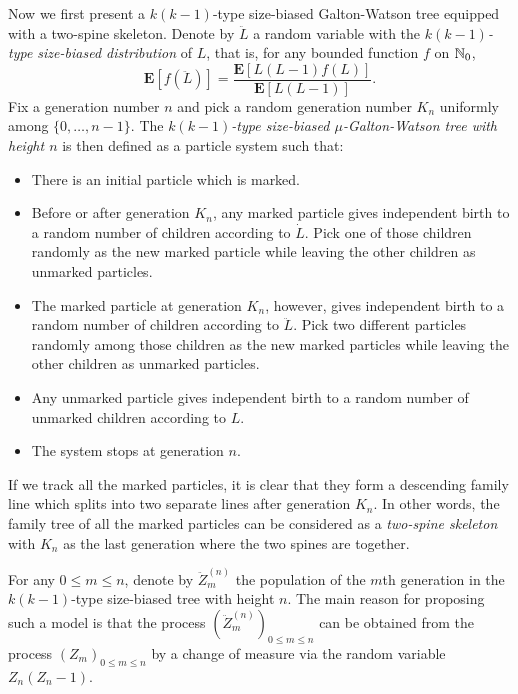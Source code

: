 \documentclass[12pt]{amsart}
\numberwithin{equation}{section}
\newcommand{\defn}[1]{{\em #1}}
\newcommand{\expr}[1]{\left( #1 \right)}
\newcommand{\brac}[1]{\left[ #1 \right]}
\newcommand{\expct}{\mathbf E}
\begin{document}
Now we first present a $k(k-1)$-type size-biased Galton-Watson tree equipped with a two-spine skeleton.
	Denote by $\ddot L$ a random variable with the \defn{$k(k-1)$-type size-biased distribution} of $L$, that is, for any
		bounded function $f$ on $\mathbb N_0$,
\begin{equation*}
		\expct\brac{f\expr{\ddot L}}
	=
		\frac{\expct\brac{L(L-1)f(L)}}{\expct\brac{L(L-1)}}.
\end{equation*}
	Fix a generation number $n$ and pick a random generation number $K_n$ uniformly among
		$\{0,\dots,n-1\}$.
	The \defn{$k(k-1)$-type size-biased $\mu$-Galton-Watson tree with height $n$} is then defined as a particle system such that:
\begin{itemize}
\item
	There is an initial particle which is marked.
\item
	Before or after generation $K_n$, any marked particle gives independent birth to a random number of children according to $\dot L$.
	Pick one of those children randomly as the new marked particle while leaving the other children as unmarked particles.
\item
	The marked particle at generation $K_n$, however, gives independent birth to a random number of children according to $\ddot L$.
	Pick two different particles randomly among those children as the new marked particles while leaving the other children as unmarked particles.
\item
	Any unmarked particle gives independent birth to a random number of unmarked children according to $L$.
\item
	The system stops at generation $n$.
\end{itemize}
\par
	If we track all the marked particles, it is clear that they form a descending family line which splits into two separate lines after generation $K_n$.
	In other words, the family tree of all the marked particles can be considered as a \defn{two-spine skeleton} with $K_n$ as the last generation where the two spines are together.
\par	
	For any $0\le m \le n$, denote by $\ddot Z_m^{(n)}$ the population of the $m$th generation in the $k(k-1)$-type size-biased tree with height $n$.
	The main reason for proposing such a model is that the process $(\ddot Z_m^{(n)})_{0\le m\le n}$ can be obtained from the process $(Z_m)_{0\le m\le n}$ by a change of measure via the random variable $Z_n(Z_n-1)$.
\end{document}
